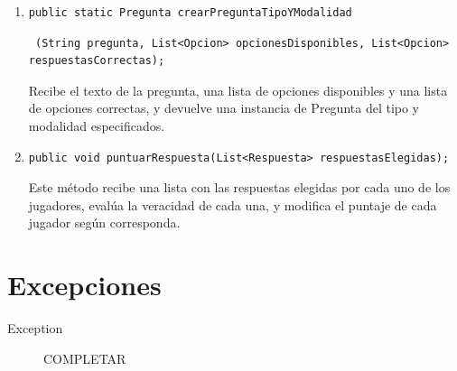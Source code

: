 \documentclass[titlepage,a4paper]{article}
\begin{document}
\begin{enumerate}
\item \begin{verbatim}public static Pregunta crearPreguntaTipoYModalidad\end{verbatim} \begin{verbatim} (String pregunta, List<Opcion> opcionesDisponibles, List<Opcion> respuestasCorrectas);\end{verbatim}
 Recibe el texto de la pregunta, una lista de opciones disponibles y una lista de opciones correctas, y devuelve una instancia de Pregunta del tipo y modalidad especificados.
\item \begin{verbatim}
public void puntuarRespuesta(List<Respuesta> respuestasElegidas);\end{verbatim}
Este método recibe una lista con las respuestas elegidas por cada uno de los jugadores, evalúa la veracidad de cada una, y modifica el puntaje de cada jugador según corresponda.
\end{enumerate}


\section{Excepciones}

\begin{description}
\item[Exception] COMPLETAR
\end{description}
\end{document}
